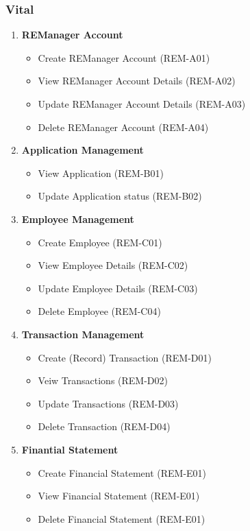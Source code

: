 \documentclass[11pt]{article}
\begin{document}
			\subsubsection{Vital}
			\begin{enumerate}[i]
				\item \textbf{REManager Account}
				\begin{itemize}
					\item Create REManager Account (REM-A01)
					\item View REManager Account Details (REM-A02)
					\item Update REManager Account Details (REM-A03)
					\item Delete REManager Account (REM-A04)
				\end{itemize}
				
				\item \textbf{Application Management}
				\begin{itemize}
					\item View Application (REM-B01)
					\item Update Application status (REM-B02)
				\end{itemize}
				
				\item \textbf{Employee Management}
				\begin{itemize}
					\item Create Employee (REM-C01)
					\item View Employee Details (REM-C02)
					\item Update Employee Details (REM-C03)
					\item Delete Employee (REM-C04)
				\end{itemize}
				
				\item \textbf{Transaction Management}
				\begin{itemize}
					\item Create (Record) Transaction  (REM-D01)
					\item Veiw Transactions  (REM-D02)
					\item Update Transactions  (REM-D03)
					\item Delete Transaction  (REM-D04)
				\end{itemize}
				
				\item \textbf{Finantial Statement}
				\begin{itemize}
					\item Create Financial Statement (REM-E01)
					\item View Financial Statement (REM-E01)
					\item Delete Financial Statement (REM-E01)
				\end{itemize}
			\end{enumerate}
			
\end{document}
